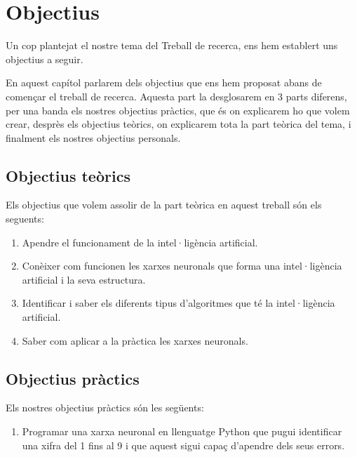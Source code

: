 \chapter{Objectius}
\label{c:objectius}
Un cop plantejat el nostre tema del Treball de recerca, ens hem establert uns objectius a seguir.

En aquest capítol parlarem dels objectius que ens hem proposat abans de començar el treball de recerca. Aquesta part la desglosarem en 3 parts diferens, per  una banda els nostres objectius pràctics, que és on explicarem ho que volem crear,  desprès els objectius teòrics, on explicarem tota la part teòrica del tema, i finalment els nostres objectius personals.

\section{Objectius teòrics}
Els objectius que volem assolir de la part teòrica en aquest treball són els seguents:

\begin{enumerate}
 \item Apendre el funcionament de la intel·ligència artificial.

 \item Conèixer com funcionen les xarxes neuronals que forma una intel·ligència artificial i la seva estructura.

\item Identificar i saber els diferents tipus d'algoritmes que té la intel·ligència artificial.

\item Saber com aplicar a la pràctica les xarxes neuronals.

\end{enumerate}

\section{Objectius pràctics}
Els nostres objectius pràctics són les següents:

\begin{enumerate}
 \item Programar una xarxa neuronal en llenguatge Python que pugui identificar una xifra del 1 fins al 9 i que aquest sigui capaç d'apendre dels seus errors.

\end{enumerate}

